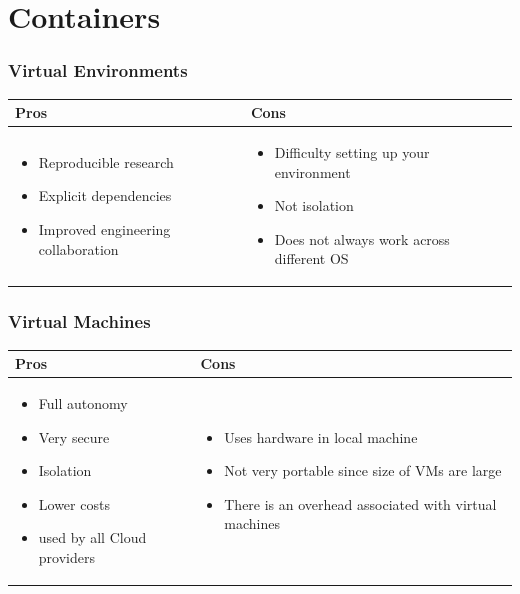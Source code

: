 
\chapter{Containers}

\subsection*{Virtual Environments}
\begin{center}
    \begin{tabular}{m{7cm}|m{7cm}}
        \textbf{Pros} & \textbf{Cons} \\ \hline
        \begin{itemize}
            \item Reproducible research
            \item Explicit dependencies
            \item Improved engineering collaboration
        \end{itemize} 
        & 
        \vspace{0.5cm}
        \begin{itemize}
            \item Difficulty setting up your environment
            \item Not isolation
            \item Does not always work across different OS
        \end{itemize} 
    \end{tabular}
\end{center}

\subsection*{Virtual Machines}
\begin{center}
    \begin{tabular}{m{7cm}|m{7cm}}
        \textbf{Pros} & \textbf{Cons} \\ \hline
        \begin{itemize}
            \item Full autonomy
            \item Very secure
            \item Isolation
            \item Lower costs
            \item used by all Cloud providers
        \end{itemize} 
        & 
        \vspace{0.5cm}
        \begin{itemize}
            \item Uses hardware in local machine
            \item Not very portable since size of VMs are large
            \item There is an overhead associated with virtual machines 
        \end{itemize} 
    \end{tabular}
\end{center}

